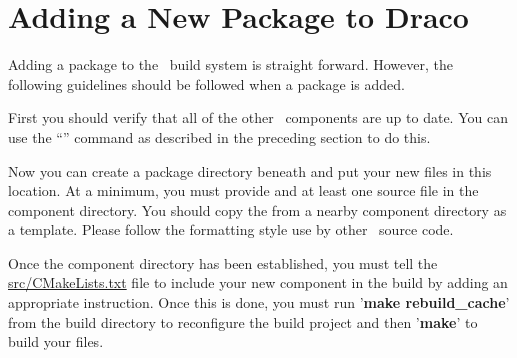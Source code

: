 
\section{Adding a New Package to Draco}

Adding a package to the \draco\ build system is straight forward.
However, the following guidelines should be followed when a package is
added.

First you should verify that all of the other \draco\ components are
up to date.  You can use the ``'' command as
described in the preceding section to do this.

Now you can create a package directory beneath
 and put your new files in this
location.  At a minimum, you must provide  and at
least one source file in the component directory.  You should copy the
 from a nearby component directory as a
template.  Please follow the formatting style use by other
\draco\ source code.


Once the component directory has been established, you must tell the
\url{src/CMakeLists.txt} file to include your new component in the
build by adding an appropriate 
instruction.  Once this is done, you must run '\textbf{make
  rebuild\_cache}' from the build directory to reconfigure the build
project and then '\textbf{make}' to build your files.

